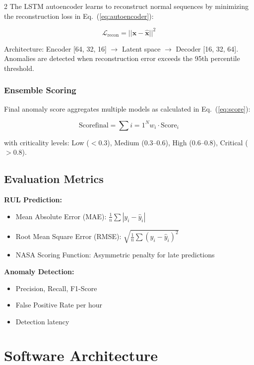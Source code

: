 \documentclass{ijceds} %
\newcommand{\equref}[1]{Eq.~(\ref{#1})} %
\begin{document}
\begin{multicols}{2}
The LSTM autoencoder learns to reconstruct normal sequences by minimizing the reconstruction loss in \equref{eq:autoencoder}:

\begin{equation}
    \mathcal{L}_{\text{recon}} = ||\mathbf{x} - \hat{\mathbf{x}}||^2
    \label{eq:autoencoder}
\end{equation}

Architecture: Encoder [64, 32, 16] $\rightarrow$ Latent space $\rightarrow$ Decoder [16, 32, 64]. Anomalies are detected when reconstruction error exceeds the 95th percentile threshold.

\subsubsection{Ensemble Scoring}

Final anomaly score aggregates multiple models as calculated in \equref{eq:score}:

\begin{equation}
    \text{Score}{\text{final}} = \sum{i=1}^{N} w_i \cdot \text{Score}_i
    \label{eq:score}
\end{equation}

with criticality levels: Low ($<0.3$), Medium ($0.3$--$0.6$), High ($0.6$--$0.8$), Critical ($>0.8$).

\subsection{Evaluation Metrics}

\textbf{RUL Prediction:}
\begin{itemize}
    \item Mean Absolute Error (MAE): $\frac{1}{n}\sum|y_i - \hat{y}_i|$
    \item Root Mean Square Error (RMSE): $\sqrt{\frac{1}{n}\sum(y_i - \hat{y}_i)^2}$
    \item NASA Scoring Function: Asymmetric penalty for late predictions
\end{itemize}

\textbf{Anomaly Detection:}
\begin{itemize}
    \item Precision, Recall, F1-Score
    \item False Positive Rate per hour
    \item Detection latency
\end{itemize}


\section{Software Architecture}
\label{sec:software-architecture}


\end{multicols}
\end{document}
